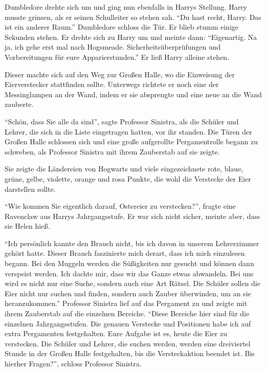 Dumbledore drehte sich um und ging nun ebenfalls in Harrys Stellung. Harry musste grinsen, als er seinen Schulleiter so stehen sah. \enquote{Du hast recht, Harry. Das ist ein anderer Raum.} Dumbledore schloss die Tür. Er blieb stumm einige Sekunden stehen. Er drehte sich zu Harry um und meinte dann: \enquote{Eigenartig. Na ja, ich gehe erst mal nach Hogsmeade. Sicherheitsüberprüfungen und Vorbereitungen für eure Apparierstunden.} Er ließ Harry alleine stehen.

Dieser machte sich auf den Weg zur Großen Halle, wo die Einweisung der Eierverstecker stattfinden sollte. Unterwegs richtete er noch eine der Messinglampen an der Wand, indem er sie absprengte und eine neue an die Wand zauberte.

\enquote{Schön, dass Sie alle da sind}, sagte Professor Sinistra, als die Schüler und Lehrer, die sich in die Liste eingetragen hatten, vor ihr standen. Die Türen der Großen Halle schlossen sich und eine große aufgerollte Pergamentrolle begann zu schweben, als Professor Sinistra mit ihrem Zauberstab auf sie zeigte.

Sie zeigte die Ländereien von Hogwarts und viele eingezeichnete rote, blaue, grüne, gelbe, violette, orange und rosa Punkte, die wohl die Verstecke der Eier darstellen sollte.

\enquote{Wie kommen Sie eigentlich darauf, Ostereier zu verstecken?}, fragte eine Ravenclaw aus Harrys Jahrgangsstufe. Er war sich nicht sicher, meinte aber, dass sie Helen hieß.

\enquote{Ich persönlich kannte den Brauch nicht, bis ich davon in unserem Lehrerzimmer gehört hatte. Dieser Brauch faszinierte mich derart, dass ich mich einzulesen begann. Bei den Muggeln werden die Süßigkeiten nur gesucht und können dann verspeist werden. Ich dachte mir, dass wir das Ganze etwas abwandeln. Bei uns wird es nicht nur eine Suche, sondern auch eine Art Rätsel. Die Schüler sollen die Eier nicht nur suchen und finden, sondern auch Zauber überwinden, um an sie heranzukommen.} Professor Sinistra lief auf das Pergament zu und zeigte mit ihrem Zauberstab auf die einzelnen Bereiche. \enquote{Diese Bereiche hier sind für die einzelnen Jahrgangsstufen. Die genauen Verstecke und Positionen habe ich auf extra Pergamenten festgehalten. Eure Aufgabe ist es, heute die Eier zu verstecken. Die Schüler und Lehrer, die suchen werden, werden eine dreiviertel Stunde in der Großen Halle festgehalten, bis die Versteckaktion beendet ist. Bis hierher Fragen?}, schloss Professor Sinistra.

